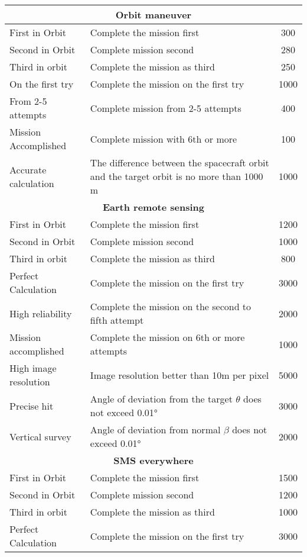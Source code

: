 \documentclass[12pt,a4paper]{article}
\begin{document}
\begin{center}
\begin{longtable}{ |p{5cm}|p{8cm}|c|}
  \hline
  \multicolumn{3}{|c|}{\textbf{Orbit maneuver}}\\
  \hline
  First in Orbit & Complete the mission first & 300\\
   \hline
   Second in Orbit & Complete mission second & 280\\
   \hline
   Third in orbit & Complete the mission as third & 250\\
   \hline
   On the first try & Complete the mission on the first try & 1000\\
   \hline
   From 2-5 attempts & Complete mission from 2-5 attempts & 400\\
   \hline
   Mission Accomplished & Complete mission with 6th or more & 100\\
   \hline
   Accurate calculation & The difference between the spacecraft orbit and the target orbit is no more than 1000 m & 1000\\
   \hline
  \multicolumn{3}{|c|}{\textbf{Earth remote sensing}}\\
  \hline
First in Orbit & Complete the mission first & 1200\\
   \hline
   Second in Orbit & Complete mission second & 1000\\
   \hline
   Third in orbit & Complete the mission as third & 800\\
   \hline
   Perfect Calculation & Complete the mission on the first try & 3000\\
   \hline
   High reliability & Complete the mission on the second to fifth attempt & 2000\\
   \hline
   Mission accomplished & Complete the mission on 6th or more attempts & 1000\\
   \hline
   High image resolution & Image resolution better than 10m per pixel & 5000\\
   \hline
   Precise hit & Angle of deviation from the target $\theta$ does not exceed 0.01° & 3000\\
   \hline
   Vertical survey & Angle of deviation from normal $\beta$ does not exceed 0.01° & 2000\\
   \hline
   \multicolumn{3}{|c|}{\textbf{SMS everywhere}}\\
   \hline
First in Orbit & Complete the mission first & 1500\\
   \hline
   Second in Orbit & Complete mission second & 1200\\
   \hline
   Third in orbit & Complete the mission as third & 1000\\
   \hline
   Perfect Calculation & Complete the mission on the first try & 3000\\

\end{longtable}
\end{center}
\end{document}
